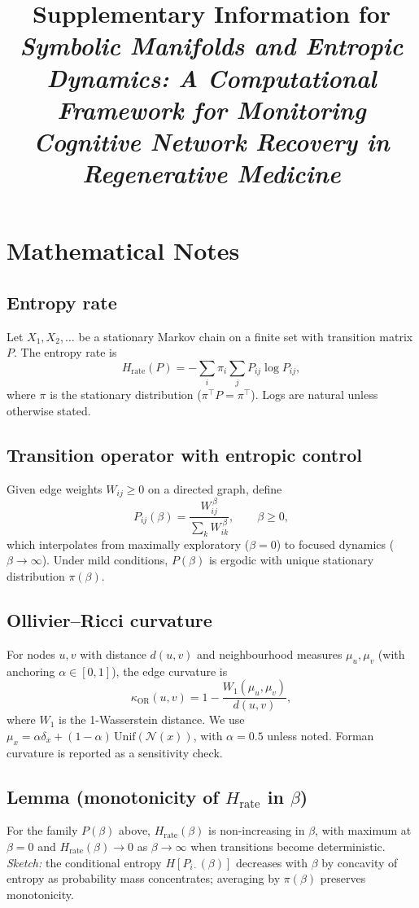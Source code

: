 \documentclass[10pt]{article}
\title{Supplementary Information for\\
\emph{Symbolic Manifolds and Entropic Dynamics: A Computational Framework for Monitoring Cognitive Network Recovery in Regenerative Medicine}}
\date{}
\begin{document}
\maketitle

\section*{Mathematical Notes}

\subsection*{Entropy rate}
Let $X_1,X_2,\dots$ be a stationary Markov chain on a finite set with transition matrix $P$. The entropy rate is
\begin{equation}
H_{\mathrm{rate}}(P)=-\sum_{i}\pi_i\sum_{j}P_{ij}\log P_{ij},
\end{equation}
where $\pi$ is the stationary distribution ($\pi^\top P=\pi^\top$). Logs are natural unless otherwise stated.

\subsection*{Transition operator with entropic control}
Given edge weights $W_{ij}\ge 0$ on a directed graph, define
\begin{equation}
P_{ij}(\beta)=\frac{W_{ij}^{\,\beta}}{\sum_{k}W_{ik}^{\,\beta}},\qquad \beta\ge 0,
\end{equation}
which interpolates from maximally exploratory ($\beta=0$) to focused dynamics ($\beta\to\infty$). Under mild conditions, $P(\beta)$ is ergodic with unique stationary distribution $\pi(\beta)$.

\subsection*{Ollivier--Ricci curvature}
For nodes $u,v$ with distance $d(u,v)$ and neighbourhood measures $\mu_u,\mu_v$ (with anchoring $\alpha\in[0,1]$), the edge curvature is
\begin{equation}
\kappa_{\mathrm{OR}}(u,v)=1-\frac{W_1(\mu_u,\mu_v)}{d(u,v)},
\end{equation}
where $W_1$ is the 1-Wasserstein distance. We use $\mu_x=\alpha\delta_x+(1-\alpha)\,\mathrm{Unif}(\mathcal{N}(x))$, with $\alpha=0.5$ unless noted. Forman curvature is reported as a sensitivity check.

\subsection*{Lemma (monotonicity of $H_{\mathrm{rate}}$ in $\beta$)}
For the family $P(\beta)$ above, $H_{\mathrm{rate}}(\beta)$ is non-increasing in $\beta$, with maximum at $\beta=0$ and $H_{\mathrm{rate}}(\beta)\to 0$ as $\beta\to\infty$ when transitions become deterministic. \emph{Sketch:} the conditional entropy $H[P_{i\cdot}(\beta)]$ decreases with $\beta$ by concavity of entropy as probability mass concentrates; averaging by $\pi(\beta)$ preserves monotonicity.
\end{document}
